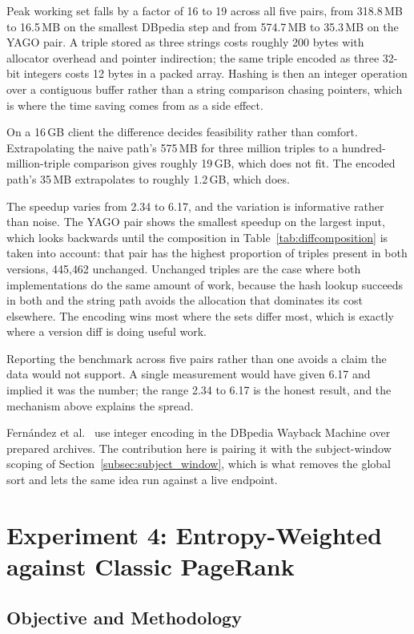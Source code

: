Peak working set falls by a factor of 16 to 19 across all five pairs, from
318.8\,MB to 16.5\,MB on the smallest DBpedia step and from 574.7\,MB to
35.3\,MB on the YAGO pair. A triple stored as
three strings costs roughly 200 bytes with allocator overhead and pointer
indirection; the same triple encoded as three 32-bit integers costs 12 bytes in a
packed array. Hashing is then an integer operation over a contiguous buffer
rather than a string comparison chasing pointers, which is where the time saving
comes from as a side effect.

On a 16\,GB client the difference decides feasibility rather than comfort.
Extrapolating the naive path's 575\,MB for three million triples to a
hundred-million-triple comparison gives roughly 19\,GB, which does not fit. The
encoded path's 35\,MB extrapolates to roughly 1.2\,GB, which does.

The speedup varies from 2.34 to 6.17, and the variation is informative rather
than noise. The YAGO pair shows the smallest speedup on the largest input, which
looks backwards until the composition in Table~\ref{tab:diffcomposition} is taken
into account: that pair has the highest proportion of triples present in both
versions, 445{,}462 unchanged. Unchanged triples are the case where both
implementations do the same amount of work, because the hash lookup succeeds in
both and the string path avoids the allocation that dominates its cost elsewhere.
The encoding wins most where the sets differ most, which is exactly where a
version diff is doing useful work.

Reporting the benchmark across five pairs rather than one avoids a claim the
data would not support. A single measurement would have given 6.17 and implied
it was the number; the range 2.34 to 6.17 is the honest result, and the
mechanism above explains the spread.

Fernández et al.~\cite{fernandez2015dbpedia} use integer encoding in the DBpedia
Wayback Machine over prepared archives. The contribution here is pairing it with
the subject-window scoping of Section~\ref{subsec:subject_window}, which is what removes
the global sort and lets the same idea run against a live endpoint.

\section{Experiment 4: Entropy-Weighted against Classic PageRank}
\label{sec:exp4}

\subsection{Objective and Methodology}

